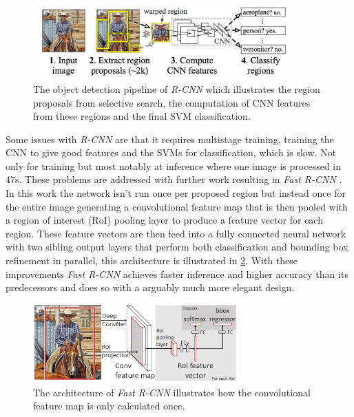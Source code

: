 \documentclass{kththesis}
\newcommand{\bibentry}[1]{\parencite{#1}}
\begin{document}
\begin{figure}[h]
  \centering
  \includegraphics[width=0.9\textwidth]{R-CNN}
  \caption{The object detection pipeline of \textit{R-CNN} which illustrates the
  region proposals from selective search, the computation of CNN features from
  these regions and the final SVM classification.}
  \label{fig:R-CNN}
  \end{figure}

Some issues with \emph{R-CNN}
are that it requires multistage training, training the CNN to give good
features and the SVMs for classification, which is slow. Not only for training
but most notably at inference where one image is processed in 47s.
These problems are addressed with further work resulting in \emph{Fast R-CNN}
\bibentry{girshick2015fast}. In this work the network isn't run once per proposed region but
instead once for the entire image generating a convolutional feature map that
is then pooled with a region of interest (RoI) pooling layer to produce a
feature vector for each region. These feature vectors are then feed into a fully
connected neural network with two sibling output layers that perform both
classification and bounding box refinement in parallel, this architecture is
illustrated in \cref{fig:FastR-CNN}. With these improvements
\emph{Fast R-CNN} achieves faster inference and higher accuracy than its
predecessors and does so with a arguably much more elegant design.

\begin{figure}[h]
  \centering
  \includegraphics[width=0.7\textwidth]{FastR-CNN}
  \caption{The architecture of \textit{Fast R-CNN} illustrates how the
    convolutional feature map is only calculated once.}
  \label{fig:FastR-CNN}
  \end{figure}
\end{document}
